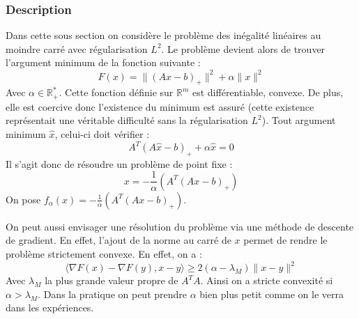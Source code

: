 \documentclass[10pt,a4paper]{article}
\begin{document}
\subsubsection{Description}
Dans cette sous section on considère le problème des inégalité linéaires au moindre carré avec régularisation $L^2$.
Le problème devient alors de trouver l'argument minimum de la fonction suivante :
\begin{equation}
F(x) = \| (Ax-b)_+ \|^2+ \alpha \| x\|^2
\end{equation}
Avec $\alpha \in \mathbb{R}_+^*$.
Cette fonction définie sur $\mathbb{R}^m$ est différentiable, convexe.
De plus, elle est coercive donc l'existence du minimum est assuré (cette existence représentait une véritable difficulté sans la régularisation $L^2$).
Tout argument minimum $\hat{x}$, celui-ci doit vérifier :
\begin{equation}
A^T(A \hat{x}-b)_+ + \alpha \hat{x}=0
\end{equation}
Il s'agit donc de résoudre un problème de point fixe :
\begin{equation}
x=-\frac{1}{\alpha}\left( A^T(Ax-b)_+\right)
\end{equation}
On pose $f_{\alpha}(x)=-\frac{1}{\alpha}\left( A^T(Ax-b)_+\right)$.

On peut aussi envisager une résolution du problème via une méthode de descente de gradient.
En effet, l'ajout de la norme au carré de $x$ permet de rendre le problème strictement convexe.
En effet, on a :
\begin{equation}
\langle \nabla F(x)-\nabla F(y), x-y \rangle \ge 2(\alpha- \lambda_M) \| x-y \|^2
\end{equation}
Avec $\lambda_M$ la plus grande valeur propre de $A^TA$. Ainsi on a stricte convexité si $\alpha>\lambda_M$.
Dans la pratique on peut prendre $\alpha$ bien plus petit comme on le verra dans les expériences.
\end{document}
